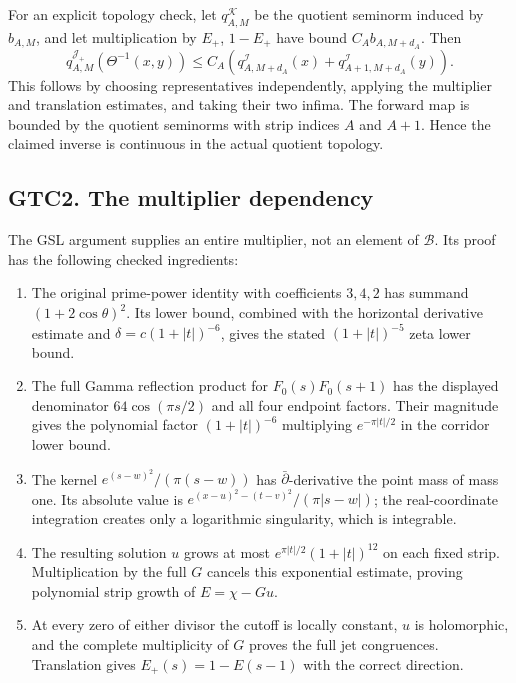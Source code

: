 For an explicit topology check, let \(q^{\mathcal K}_{A,M}\) be the
quotient seminorm induced by \(b_{A,M}\), and let multiplication by
\(E_+\), \(1-E_+\) have bound \(C_A b_{A,M+d_A}\). Then \[
q^{\mathcal J_+}_{A,M}(\Theta^{-1}(x,y))
\le C_A\left(
q^{\mathcal I}_{A,M+d_A}(x)
+q^{\mathcal I}_{A+1,M+d_A}(y)\right).
\] This follows by choosing representatives independently, applying the
multiplier and translation estimates, and taking their two infima. The
forward map is bounded by the quotient seminorms with strip indices
\(A\) and \(A+1\). Hence the claimed inverse is continuous in the actual
quotient topology.

\subsection{GTC2. The multiplier
dependency}\label{gtc2.-the-multiplier-dependency}

The GSL argument supplies an entire multiplier, not an element of
\(\mathcal B\). Its proof has the following checked ingredients:

\begin{enumerate}
\def\labelenumi{\arabic{enumi}.}
\tightlist
\item
  The original prime-power identity with coefficients \(3,4,2\) has
  summand \((1+2\cos\theta)^2\). Its lower bound, combined with the
  horizontal derivative estimate and \(\delta=c(1+|t|)^{-6}\), gives the
  stated \((1+|t|)^{-5}\) zeta lower bound.
\item
  The full Gamma reflection product for \(F_0(s)F_0(s+1)\) has the
  displayed denominator \(64\cos(\pi s/2)\) and all four endpoint
  factors. Their magnitude gives the polynomial factor \((1+|t|)^{-6}\)
  multiplying \(e^{-\pi|t|/2}\) in the corridor lower bound.
\item
  The kernel \(e^{(s-w)^2}/(\pi(s-w))\) has \(\bar\partial\)-derivative
  the point mass of mass one. Its absolute value is
  \(e^{(x-u)^2-(t-v)^2}/(\pi|s-w|)\); the real-coordinate integration
  creates only a logarithmic singularity, which is integrable.
\item
  The resulting solution \(u\) grows at most
  \(e^{\pi|t|/2}(1+|t|)^{12}\) on each fixed strip. Multiplication by
  the full \(G\) cancels this exponential estimate, proving polynomial
  strip growth of \(E=\chi-Gu\).
\item
  At every zero of either divisor the cutoff is locally constant, \(u\)
  is holomorphic, and the complete multiplicity of \(G\) proves the full
  jet congruences. Translation gives \(E_+(s)=1-E(s-1)\) with the
  correct direction.
\end{enumerate}

